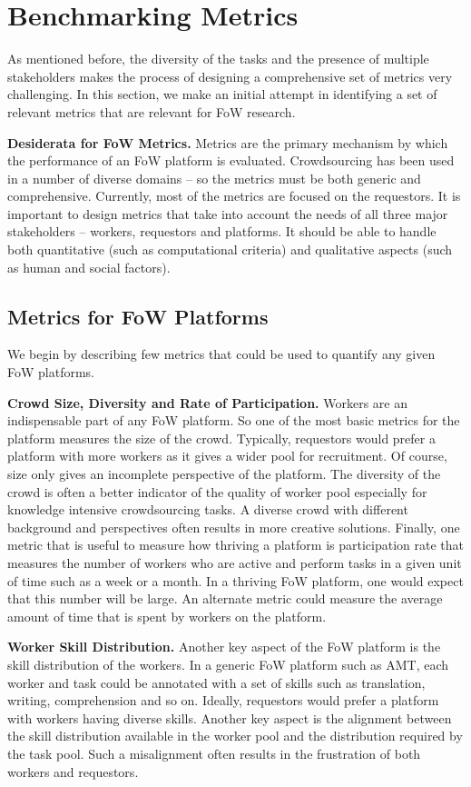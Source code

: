 \section{Benchmarking Metrics}
\label{sec:benchmarkingMetrics}

As mentioned before, the diversity of the tasks and the presence of multiple stakeholders
makes the process of designing a comprehensive set of metrics very challenging.
In this section, we make an initial attempt in identifying a set of relevant metrics
that are relevant for FoW research.

\textbf{Desiderata for FoW Metrics.}
Metrics are the primary mechanism by which the performance of an FoW platform is evaluated.
Crowdsourcing has been used in a number of diverse domains -- so the metrics must be both generic and comprehensive.
Currently, most of the metrics are focused on the requestors.
It is important to design metrics that take into account the needs of all three major stakeholders -- workers, requestors and platforms.
It should be able to handle both quantitative (such as computational criteria)
and qualitative aspects (such as human and social factors).

\subsection{Metrics for FoW Platforms}
We begin by describing few metrics that could be used to quantify any given FoW platforms.

\textbf{Crowd Size, Diversity and Rate of Participation.}
Workers are an indispensable part of any FoW platform.
So one of the most basic metrics for the platform measures the size of the crowd.
Typically, requestors would prefer a platform with more workers as it gives a wider pool for recruitment.
Of course, size only gives an incomplete perspective of the platform.
The diversity of the crowd is often a better indicator of the quality of worker pool
especially for knowledge intensive crowdsourcing tasks.
A diverse crowd with different background and perspectives
often results in more creative solutions.
Finally, one metric that is useful to measure how thriving a platform is
participation rate that measures the number of workers who are active and perform tasks in a given unit of time such as  a week or a month.
In a thriving FoW platform, one would expect that this number will be large.
An alternate metric could measure the average amount of time that is spent by workers on the platform.

\textbf{Worker Skill Distribution.}
Another key aspect of the FoW platform is the skill distribution of the workers.
In a generic FoW platform such as AMT, each worker and task could be annotated with a set of skills
such as translation, writing, comprehension and so on.
Ideally, requestors would prefer a platform with workers having diverse skills.
Another key aspect is the alignment between the skill distribution
available in the worker pool and the distribution required by the task pool.
Such a misalignment often results in the frustration of both workers and requestors.

